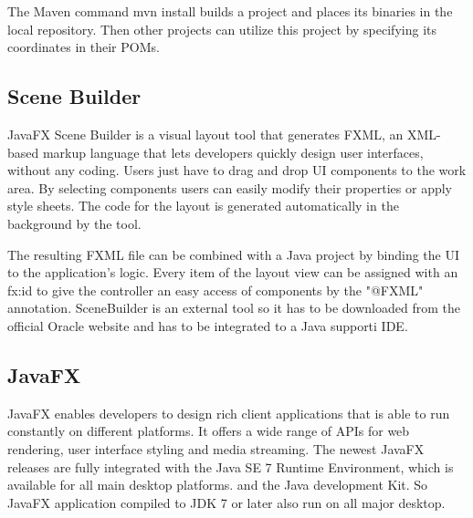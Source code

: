 The Maven command mvn install  builds a project and places its binaries in the local repository. Then other projects can utilize this project by specifying its coordinates in their POMs.

\subsection{Scene Builder} \label{sec:SceneBuilder}
JavaFX Scene Builder is a visual layout tool that generates FXML, an XML-based markup language that lets developers  quickly design user interfaces, without any coding. Users just have to drag and drop UI components to the work area. By selecting components users can easily modify their properties or apply style sheets. The  code for the layout is generated automatically in the background by the tool.

The resulting FXML file can be combined with a Java project by binding the UI to the application’s logic. Every item of the layout view can be assigned with an fx:id to give the controller an easy access of components by the "@FXML"  annotation.  SceneBuilder is an external tool so it has to be downloaded from the official Oracle website and has to be integrated to a Java supporti IDE. 

\subsection{JavaFX}
JavaFX enables developers to design rich client applications that is able to run constantly on different platforms. It offers a wide range of APIs for web rendering, user interface styling and media streaming. The newest JavaFX releases are fully integrated with the Java SE 7 Runtime Environment, which is available for all main desktop platforms. and the Java development Kit. So JavaFX application compiled to JDK 7 or later also run on all major desktop. 

